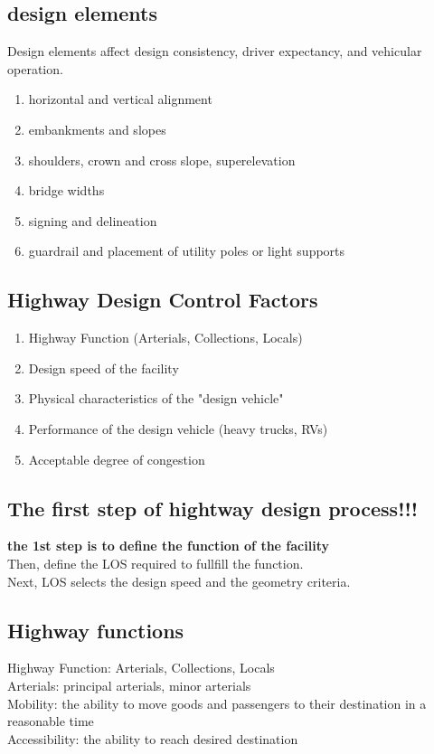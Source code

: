 \documentclass{article}
\begin{document}
  \subsection{design elements}
  Design elements affect design consistency, driver expectancy, and vehicular operation.
  \begin{enumerate}
    \item horizontal and vertical alignment
    \item embankments and slopes
    \item shoulders, crown and cross slope, superelevation
    \item bridge widths
    \item signing and delineation
    \item guardrail and placement of utility poles or light supports
  \end{enumerate}

  \subsection{Highway Design Control Factors}
  \begin{enumerate}
    \item Highway Function (Arterials, Collections, Locals)
    \item Design speed of the facility
    \item Physical characteristics of the "design vehicle" 
    \item Performance of the design vehicle (heavy trucks, RVs)
    \item Acceptable degree of congestion
  \end{enumerate}

  \subsection{The first step of hightway design process!!!}
  \textbf{the 1st step is to define the function of the facility}\\
  Then, define the LOS required to fullfill the function.\\
  Next, LOS selects the design speed and the geometry criteria. \\


  \subsection{Highway functions}
    Highway Function: Arterials, Collections, Locals \\
    Arterials: principal arterials, minor arterials \\
    Mobility: the ability to move goods and passengers to their destination in a reasonable time \\
    Accessibility: the ability to reach desired destination \\
\end{document}
